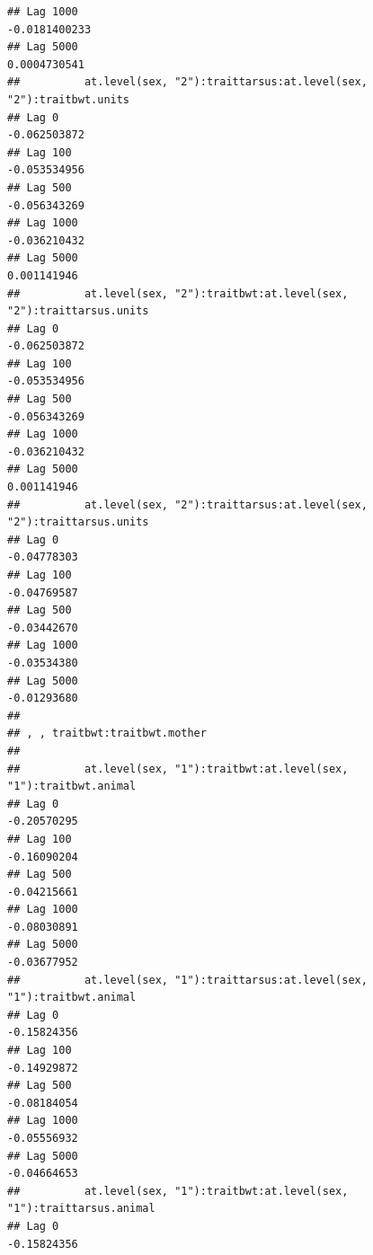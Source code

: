 \documentclass[
  12pt,
]{book}
\begin{document}
\begin{verbatim}
## Lag 1000                                                 -0.0181400233
## Lag 5000                                                  0.0004730541
##          at.level(sex, "2"):traittarsus:at.level(sex, "2"):traitbwt.units
## Lag 0                                                        -0.062503872
## Lag 100                                                      -0.053534956
## Lag 500                                                      -0.056343269
## Lag 1000                                                     -0.036210432
## Lag 5000                                                      0.001141946
##          at.level(sex, "2"):traitbwt:at.level(sex, "2"):traittarsus.units
## Lag 0                                                        -0.062503872
## Lag 100                                                      -0.053534956
## Lag 500                                                      -0.056343269
## Lag 1000                                                     -0.036210432
## Lag 5000                                                      0.001141946
##          at.level(sex, "2"):traittarsus:at.level(sex, "2"):traittarsus.units
## Lag 0                                                            -0.04778303
## Lag 100                                                          -0.04769587
## Lag 500                                                          -0.03442670
## Lag 1000                                                         -0.03534380
## Lag 5000                                                         -0.01293680
## 
## , , traitbwt:traitbwt.mother
## 
##          at.level(sex, "1"):traitbwt:at.level(sex, "1"):traitbwt.animal
## Lag 0                                                       -0.20570295
## Lag 100                                                     -0.16090204
## Lag 500                                                     -0.04215661
## Lag 1000                                                    -0.08030891
## Lag 5000                                                    -0.03677952
##          at.level(sex, "1"):traittarsus:at.level(sex, "1"):traitbwt.animal
## Lag 0                                                          -0.15824356
## Lag 100                                                        -0.14929872
## Lag 500                                                        -0.08184054
## Lag 1000                                                       -0.05556932
## Lag 5000                                                       -0.04664653
##          at.level(sex, "1"):traitbwt:at.level(sex, "1"):traittarsus.animal
## Lag 0                                                          -0.15824356

\end{verbatim}
\end{document}
